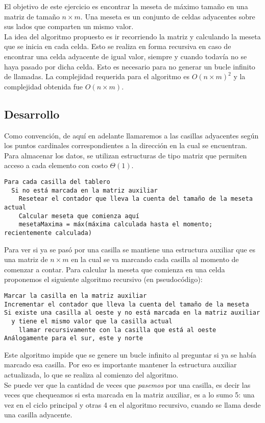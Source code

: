 \documentclass[10pt, a4paper,english,spanish]{article}
\begin{document}
El objetivo de este ejercicio es encontrar la meseta de máximo tamaño en una matriz de tamaño
$n\times m$. Una meseta es un conjunto de celdas adyacentes sobre sus lados que comparten un mismo valor. \\
\indent La idea del algoritmo propuesto es ir recorriendo la matriz y calculando la meseta que se inicia en cada
celda. Esto se realiza en forma recursiva en caso de encontrar una celda adyacente de igual valor, siempre
y cuando todavía no se haya pasado por dicha celda. Esto es necesario para no generar un bucle infinito
de llamadas. La complejidad requerida para el algoritmo es $O(n\times m)^2$ y la complejidad obtenida
fue $O(n\times m)$.

\subsection{Desarrollo}

Como convención, de aquí en adelante llamaremos a las casillas adyacentes según los puntos cardinales
correspondientes a la dirección en la cual se encuentran.
\\
\indent Para almacenar los datos, se utilizan estructuras de tipo matriz que permiten acceso a cada elemento
con costo $\Theta(1)$.

\begin{verbatim}  
Para cada casilla del tablero
  Si no está marcada en la matriz auxiliar
    Resetear el contador que lleva la cuenta del tamaño de la meseta actual
    Calcular meseta que comienza aquí
    mesetaMaxima = máx(máxima calculada hasta el momento; recientemente calculada)
\end{verbatim}

Para ver si ya se pasó por una casilla se mantiene una estructura auxiliar
que es una matriz de $n\times m$ en la cual se va marcando cada casilla
al momento de comenzar a contar.
Para calcular la meseta que comienza en una celda proponemos 
el siguiente algoritmo recursivo (en pseudocódigo):

\begin{verbatim}
Marcar la casilla en la matriz auxiliar
Incrementar el contador que lleva la cuenta del tamaño de la meseta
Si existe una casilla al oeste y no está marcada en la matriz auxiliar
  y tiene el mismo valor que la casilla actual
    llamar recursivamente con la casilla que está al oeste
Análogamente para el sur, este y norte
\end{verbatim}

Este algoritmo impide que se genere un bucle infinito al preguntar si ya se había marcado esa casilla.
Por eso es importante mantener la estructura auxiliar actualizada, lo que se realiza al comienzo del algoritmo.\\
\indent Se puede ver que la cantidad de veces que \textit{pasemos} por una casilla, es decir las veces que chequeamos si esta marcada en
la matriz auxiliar, es a lo sumo 5: una vez en el ciclo principal y otras 4 en el algoritmo recursivo, cuando se llama desde una 
casilla adyacente.
\end{document}
